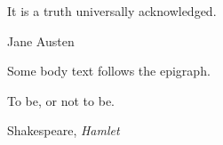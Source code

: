 \documentclass{article}
\begin{document}
\epigraph{It is a truth universally acknowledged.}{Jane Austen}
Some body text follows the epigraph.

\epigraph{To be, or not to be.}{Shakespeare, \textit{Hamlet}}
\end{document}
